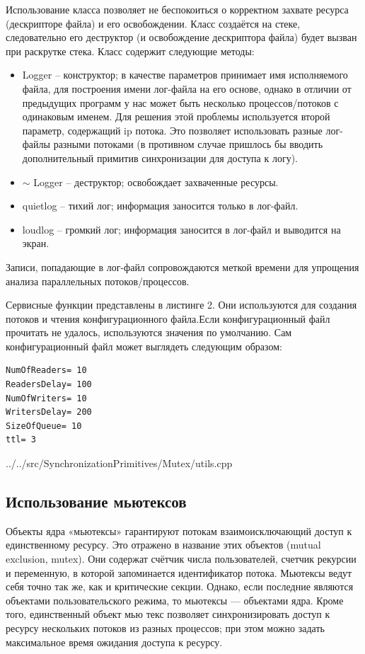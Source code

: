 \documentclass[a4paper, 12pt]{article}		%
\begin{document}
Использование класса позволяет не беспокоиться о корректном захвате ресурса (дескрипторе файла) и его освобождении. Класс создаётся на стеке, следовательно его деструктор (и освобождение дескриптора файла) будет вызван при раскрутке стека. Класс содержит следующие методы:
\begin{itemize}
\item Logger -- конструктор; в качестве параметров принимает имя исполняемого файла, для построения имени лог-файла на его основе, однако в отличии от предыдущих программ у нас может быть несколько процессов/потоков с одинаковым именем. Для решения этой проблемы используется второй параметр, содержащий ip потока. Это позволяет использовать разные лог-файлы разными потоками (в противном случае пришлось бы вводить дополнительный примитив синхронизации для доступа к логу).
\item $\sim$ Logger -- деструктор; освобождает захваченные ресурсы.
\item quietlog -- тихий лог; информация заносится только в лог-файл.
\item loudlog -- громкий лог; информация заносится в лог-файл и выводится на экран.
\end{itemize}
\vspace{1em}

Записи, попадающие в лог-файл сопровождаются меткой времени для упрощения анализа параллельных потоков/процессов.

Сервисные функции представлены в листинге 2. Они используются для создания потоков и чтения конфигурационного файла.Если конфигурационный файл прочитать не удалось, используются значения по умолчанию. Сам конфигурационный файл может выглядеть следующим образом:
\begin{verbatim}
NumOfReaders= 10
ReadersDelay= 100
NumOfWriters= 10
WritersDelay= 200
SizeOfQueue= 10
ttl= 3
\end{verbatim}


{../../src/SynchronizationPrimitives/Mutex/utils.cpp}

\newpage
\subsection{Использование мьютексов}

Объекты ядра «мьютексы» гарантируют потокам взаимоисключающий доступ к единственному ресурсу. Это отражено в название этих объектов (mutual exclusion, mutex). Они содержат счётчик числа пользователей, счетчик рекурсии и переменную, в которой запоминается идентификатор потока. Мьютексы ведут себя точно так же, как и критические секции. Однако, если последние являются объектами пользовательского режима, то мьютексы — объектами ядра. Кроме того, единственный объект мью текс позволяет синхронизировать доступ к ресурсу нескольких потоков из разных процессов; при этом можно задать максимальное время ожидания доступа к ресурсу\cite{Ogins}.
\end{document}
